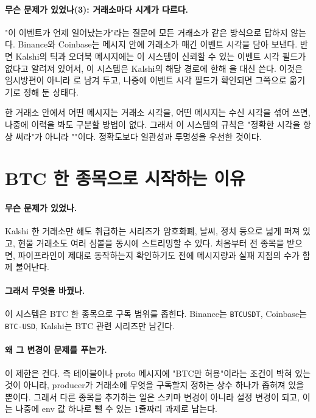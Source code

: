\paragraph{무슨 문제가 있었나(3): 거래소마다 시계가 다르다.} "이 이벤트가 언제
일어났는가"라는 질문에 모든 거래소가 같은 방식으로 답하지 않는다. Binance와
Coinbase는 메시지 안에 거래소가 매긴 이벤트 시각을 담아 보낸다. 반면 Kalshi의 틱과
오더북 메시지에는 이 시스템이 신뢰할 수 있는 이벤트 시각 필드가 없다고 알려져
있어서, 이 시스템은 Kalshi의 해당 경로에 한해 을
대신 쓴다. 이것은 임시방편이 아니라 로 남겨 두고, 나중에 이벤트
시각 필드가 확인되면 그쪽으로 옮기기로 정해 둔 상태다.

\begin{callout}
한 거래소 안에서 어떤 메시지는 거래소 시각을, 어떤 메시지는 수신 시각을 섞어 쓰면,
나중에 이력을 봐도  구분할 방법이 없다. 그래서
이 시스템의 규칙은 "정확한 시각을 항상 써라"가 아니라 ""이다. 정확도보다 일관성과
투명성을 우선한 것이다.
\end{callout}

\section{BTC 한 종목으로 시작하는 이유}
\label{sec:problem-btc-only}

\paragraph{무슨 문제가 있었나.} Kalshi 한 거래소만 해도 취급하는 시리즈가 암호화폐,
날씨, 정치 등으로 넓게 퍼져 있고, 현물 거래소도 여러 심볼을 동시에 스트리밍할 수
있다. 처음부터 전 종목을 받으면, 파이프라인이 제대로 동작하는지 확인하기도 전에
메시지량과 실패 지점의 수가 함께 불어난다.

\paragraph{그래서 무엇을 바꿨나.} 이 시스템은 BTC 한 종목으로 구독 범위를 좁힌다.
Binance는 \texttt{BTCUSDT}, Coinbase는 \texttt{BTC-USD}, Kalshi는 BTC 관련 시리즈만
남긴다.

\paragraph{왜 그 변경이 문제를 푸는가.} 이 제한은 
건다. 즉 테이블이나 proto 메시지에 "BTC만 허용"이라는 조건이 박혀 있는 것이 아니라,
producer가 거래소에 무엇을 구독할지 정하는 상수 하나가 좁혀져 있을 뿐이다. 그래서
다른 종목을 추가하는 일은 스키마 변경이 아니라 설정 변경이 되고, 이는 나중에 env
값 하나로 뺄 수 있는 1줄짜리 과제로 남는다.

